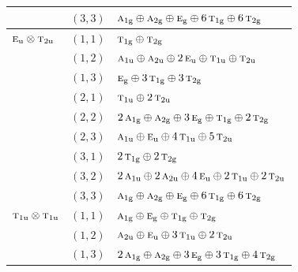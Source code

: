 \documentclass[11pt]{article}
\newcommand{\irr}[1]{\text{\normalfont\scshape #1}}
\newcommand{\ptag}[1]{\mathrm{#1}}
\begin{document}
\begin{longtable}{p{} c p{}}
 & $(3,3)$ & $\irr{a}_{1\ptag{g}}\oplus \irr{a}_{2\ptag{g}}\oplus \irr{e}_{\ptag{g}}\oplus 6\,\irr{t}_{1\ptag{g}}\oplus 6\,\irr{t}_{2\ptag{g}}$\\

\hline

$\irr{e}_{\ptag{u}}\otimes \irr{t}_{2\ptag{u}}$ & $(1,1)$ & $\irr{t}_{1\ptag{g}}\oplus \irr{t}_{2\ptag{g}}$\\

 & $(1,2)$ & $\irr{a}_{1\ptag{u}}\oplus \irr{a}_{2\ptag{u}}\oplus 2\,\irr{e}_{\ptag{u}}\oplus \irr{t}_{1\ptag{u}}\oplus \irr{t}_{2\ptag{u}}$\\

 & $(1,3)$ & $\irr{e}_{\ptag{g}}\oplus 3\,\irr{t}_{1\ptag{g}}\oplus 3\,\irr{t}_{2\ptag{g}}$\\

 & $(2,1)$ & $\irr{t}_{1\ptag{u}}\oplus 2\,\irr{t}_{2\ptag{u}}$\\

 & $(2,2)$ & $2\,\irr{a}_{1\ptag{g}}\oplus \irr{a}_{2\ptag{g}}\oplus 3\,\irr{e}_{\ptag{g}}\oplus \irr{t}_{1\ptag{g}}\oplus 2\,\irr{t}_{2\ptag{g}}$\\

 & $(2,3)$ & $\irr{a}_{1\ptag{u}}\oplus \irr{e}_{\ptag{u}}\oplus 4\,\irr{t}_{1\ptag{u}}\oplus 5\,\irr{t}_{2\ptag{u}}$\\

 & $(3,1)$ & $2\,\irr{t}_{1\ptag{g}}\oplus 2\,\irr{t}_{2\ptag{g}}$\\

 & $(3,2)$ & $2\,\irr{a}_{1\ptag{u}}\oplus 2\,\irr{a}_{2\ptag{u}}\oplus 4\,\irr{e}_{\ptag{u}}\oplus 2\,\irr{t}_{1\ptag{u}}\oplus 2\,\irr{t}_{2\ptag{u}}$\\

 & $(3,3)$ & $\irr{a}_{1\ptag{g}}\oplus \irr{a}_{2\ptag{g}}\oplus \irr{e}_{\ptag{g}}\oplus 6\,\irr{t}_{1\ptag{g}}\oplus 6\,\irr{t}_{2\ptag{g}}$\\

\hline

$\irr{t}_{1\ptag{u}}\otimes \irr{t}_{1\ptag{u}}$ & $(1,1)$ & $\irr{a}_{1\ptag{g}}\oplus \irr{e}_{\ptag{g}}\oplus \irr{t}_{1\ptag{g}}\oplus \irr{t}_{2\ptag{g}}$\\

 & $(1,2)$ & $\irr{a}_{2\ptag{u}}\oplus \irr{e}_{\ptag{u}}\oplus 3\,\irr{t}_{1\ptag{u}}\oplus 2\,\irr{t}_{2\ptag{u}}$\\

 & $(1,3)$ & $2\,\irr{a}_{1\ptag{g}}\oplus \irr{a}_{2\ptag{g}}\oplus 3\,\irr{e}_{\ptag{g}}\oplus 3\,\irr{t}_{1\ptag{g}}\oplus 4\,\irr{t}_{2\ptag{g}}$\\


\end{longtable}
\end{document}
